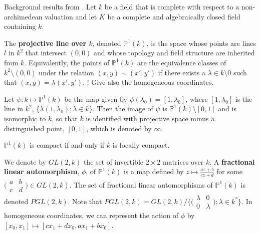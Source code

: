 Background results from \cite{gvdp}. Let $k$ be a field that is complete with respect to a non-archimedean valuation and let $K$ be a complete and algebraically closed field containing $k$. 

\begin{definition*}\cite{gvdp} The \textbf{projective line over $k$}, denoted $\mathbb{P}^1(k)$, is the space whose points are lines $l$ in $k^2$ that intersect $(0,0)$ and whose topology and field structure are inherited from $k$. Equivalently, the points of  $\mathbb{P}^1(k)$ are the equivalence classes of $k^2 \setminus (0,0)$ under the relation $(x,y) \sim (x',y')$ if there exists a $\lambda \in k\setminus 0$ such that  $(x,y) = \lambda(x',y')$. ! Give also the homogeneous coordinates.
\end{definition*}

\begin{proposition*} \cite{gvdp} Let $\psi: k \mapsto \mathbb{P}^1(k)$ be the map given by $\psi(\lambda_0) = [1, \lambda_0]$, where $ [1, \lambda_0]$ is the line in $k^2$, $\{\lambda(1, \lambda_0); \lambda \in k\}$. Then the image of $\psi$ is $\mathbb{P}^1(k) \setminus [0,1]$ and is isomorphic to $k$, so that $k$ is identified with projective space minus a distinguished point, $[0,1]$, which is denoted by $\infty$.  
\end{proposition*}

\begin{proposition*} \cite{gvdp}
	$\mathbb{P}^1(k)$ is compact if and only if $k$ is locally compact.
\end{proposition*}

\begin{definition*} \cite{gvdp}
We denote by $GL(2,k)$ the set of invertible $2 \times 2$ matrices over $k$. A \textbf{fractional linear automorphism}, $\phi$, of $\mathbb{P}^1(k)$ is a map  defined by $z \mapsto \frac{az +b}{cz +d}$ for some 
$\bigl( \begin{smallmatrix}a & b\\ c &d\end{smallmatrix}\bigr) \in GL(2,k)$. The set of fractional linear automorphisms of $\mathbb{P}^1(k)$ is denoted $PGL(2,k)$. Note that $PGL(2,k) = GL(2,k) / \{ \bigl( \begin{smallmatrix}\lambda & 0\\ 0 &\lambda \end{smallmatrix}\bigr); \lambda \in k^*  \}$. In homogeneous coordinates, we can represent the action of $\phi$ by $[x_0,x_1] \mapsto [cx_1 +dx_0, ax_1 +bx_0]$. 
\end{definition*}



